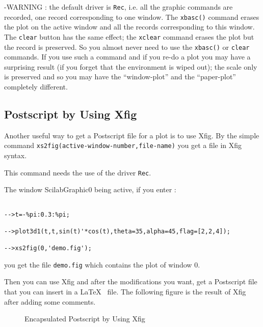 -WARNING : the default driver is {\tt Rec}, i.e. all the graphic commands are
recorded, one record corresponding to one window. The {\tt xbasc()} command
erases the plot on the active window and all the records corresponding to
this window. The {\tt  clear} button has the same effect; the {\tt xclear}
command erases the plot but the record is preserved. So you almost never need
to use the {\tt xbasc()} or {\tt  clear} commands. If you use such a command 
and if you re-do a plot you may have a surprising result (if you forget
that the environment is wiped out); the scale only is preserved and so you 
may have the ``window-plot'' and the ``paper-plot'' completely different.


\subsection{Postscript by Using Xfig}

Another useful way to get a Postscript file for a plot is to use Xfig.
By the simple command {\tt xs2fig(active-window-number,file-name)} you get
a file in Xfig syntax. 

This command needs the use of the driver {\tt Rec}.

The window ScilabGraphic0 being  active, if you enter :

\begin{verbatim}

-->t=-%pi:0.3:%pi;
 
-->plot3d1(t,t,sin(t)'*cos(t),theta=35,alpha=45,flag=[2,2,4]);
 
-->xs2fig(0,'demo.fig');   

\end{verbatim}

you get the file {\tt demo.fig} which contains the plot 
of window 0. 

Then you can use Xfig and after the modifications you want, get a Postscript 
file that you can insert in a \LaTeX~ file. The following figure is the result
of Xfig after adding some comments.

\begin{figure}

\caption{Encapsulated Postscript by Using Xfig}
\label{xfig2ps}
\end{figure}


